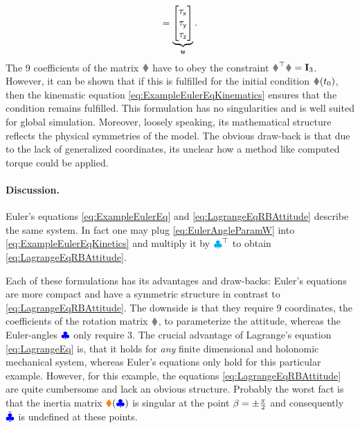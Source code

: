 \begin{subequations}
\begin{align}
 = 
 \underbrace{\begin{bmatrix} \tau_{\mathsf{x}} \\ \tau_{\mathsf{y}} \\ \tau_{\mathsf{z}} \end{bmatrix}}_{\boldsymbol{u}}.
 \label{eq:ExampleEulerEqKinetics}
\end{align}
\end{subequations}
The 9 coefficients of the matrix $\R$ have to obey the constraint $\R^\top \R = \idMat[3]$.
However, it can be shown that if this is fulfilled for the initial condition $\R(t_0)$, then the kinematic equation \eqref{eq:ExampleEulerEqKinematics} ensures that the condition remains fulfilled.
This formulation has no singularities and is well suited for global simulation.
Moreover, loosely speaking, its mathematical structure reflects the physical symmetries of the model.
The obvious draw-back is that due to the lack of generalized coordinates, its unclear how a method like computed torque could be applied.

\paragraph{Discussion.}
Euler's equations \eqref{eq:ExampleEulerEq} and \eqref{eq:LagrangeEqRBAttitude} describe the same system.
In fact one may plug \eqref{eq:EulerAngleParamW} into \eqref{eq:ExampleEulerEqKinetics} and multiply it by $\boldsymbol{\textcolor{cyan}{\clubsuit}}^\top$ to obtain \eqref{eq:LagrangeEqRBAttitude}.

Each of these formulations has its advantages and draw-backs:
Euler's equations are more compact and have a symmetric structure in contrast to \eqref{eq:LagrangeEqRBAttitude}.
The downside is that they require 9 coordinates, the coefficients of the rotation matrix $\R$, to parameterize the attitude, whereas the Euler-angles $\boldsymbol{\textcolor{blue}{\clubsuit}}$ only require 3.
The crucial advantage of Lagrange's equation \eqref{eq:LagrangeEq} is, that it holds for \textit{any} finite dimensional and holonomic mechanical system, whereas Euler's equations only hold for this particular example.
However, for this example, the equations \eqref{eq:LagrangeEqRBAttitude} are quite cumbersome and lack an obvious structure.
Probably the worst fact is that the inertia matrix $\boldsymbol{\textcolor{orange}{\blacklozenge}}(\boldsymbol{\textcolor{blue}{\clubsuit}})$ is singular at the point $\beta=\pm\tfrac{\pi}{2}$ and consequently $\ddot{\boldsymbol{\textcolor{blue}{\clubsuit}}}$ is undefined at these points.

